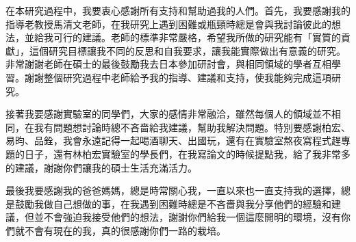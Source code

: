 \begin{acknowledgement}%

在本研究過程中，我要衷心感謝所有支持和幫助過我的人們。首先，我要感謝我的指導老教授馬清文老師，在我研究上遇到困難或瓶頸時總是會與我討論彼此的想法，並給我可行的建議。老師的標準非常嚴格，希望我所做的研究能有「實質的貢獻」，這個研究目標讓我不同的反思和自我要求，讓我能實際做出有意義的研究。非常謝謝老師在碩士的最後鼓勵我去日本參加研討會，與相同領域的學者互相學習。謝謝整個研究過程中老師給予我的指導、建議和支持，使我能夠完成這項研究。

接著我要感謝實驗室的同學們，大家的感情非常融洽，雖然每個人的領域並不相同，在我有問題想討論時總不吝嗇給我建議，幫助我解決問題。特別要感謝柏宏、易昀、品銓，我會永遠記得一起喝酒聊天、出國玩，還有在實驗室熬夜寫程式趕專題的日子，還有林柏宏實驗室的學長們，在我寫論文的時候提點我，給了我非常多的建議，謝謝你們讓我的碩士生活充滿活力。

最後我要感謝我的爸爸媽媽，總是時常關心我，一直以來也一直支持我的選擇，總是鼓勵我做自己想做的事，在我遇到困難時總是不吝嗇與我分享他們的經驗和建議，但並不會強迫我接受他們的想法，謝謝你們給我一個這麼開明的環境，沒有你們就不會有現在的我，真的很感謝你們一路的栽培。
\thispagestyle{empty}
\end{acknowledgement}
